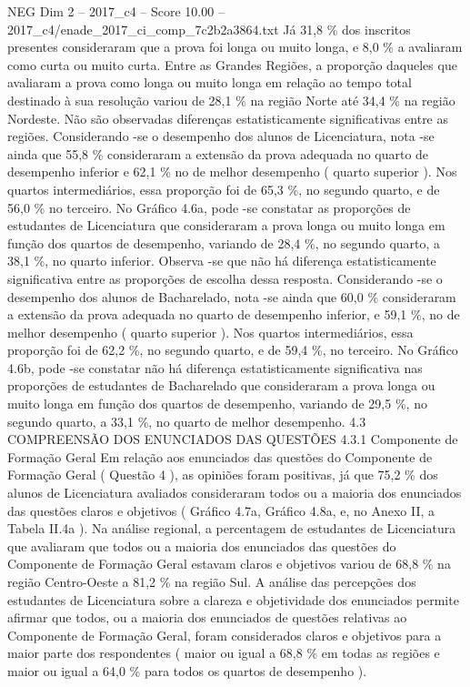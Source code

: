 \begin{textsample}{NEG Dim 2 – 2017\_c4 – Score 10.00 – 2017\_c4/enade\_2017\_ci\_comp\_7c2b2a3864.txt}
Já 31,8 \% dos inscritos presentes consideraram que a prova foi longa ou muito longa, e 8,0 \% a avaliaram como curta ou muito curta.
Entre as Grandes Regiões, a proporção daqueles que avaliaram a prova como longa ou muito longa em relação ao tempo total destinado à sua resolução variou de 28,1 \% na região Norte até 34,4 \% na região Nordeste.
Não são observadas diferenças estatisticamente significativas entre as regiões.
Considerando -se o desempenho dos alunos de Licenciatura, nota -se ainda que 55,8 \% consideraram a extensão da prova adequada no quarto de desempenho inferior e 62,1 \% no de melhor desempenho ( quarto superior ).
Nos quartos intermediários, essa proporção foi de 65,3 \%, no segundo quarto, e de 56,0 \% no terceiro.
No Gráfico 4.6a, pode -se constatar as proporções de estudantes de Licenciatura que consideraram a prova longa ou muito longa em função dos quartos de desempenho, variando de 28,4 \%, no segundo quarto, a 38,1 \%, no quarto inferior.
Observa -se que não há diferença estatisticamente significativa entre as proporções de escolha dessa resposta.
Considerando -se o desempenho dos alunos de Bacharelado, nota -se ainda que 60,0 \% consideraram a extensão da prova adequada no quarto de desempenho inferior, e 59,1 \%, no de melhor desempenho ( quarto superior ).
Nos quartos intermediários, essa proporção foi de 62,2 \%, no segundo quarto, e de 59,4 \%, no terceiro.
No Gráfico 4.6b, pode -se constatar não há diferença estatisticamente significativa nas proporções de estudantes de Bacharelado que consideraram a prova longa ou muito longa em função dos quartos de desempenho, variando de 29,5 \%, no segundo quarto, a 33,1 \%, no quarto de melhor desempenho. 4.3 COMPREENSÃO DOS ENUNCIADOS DAS QUESTÕES 4.3.1 Componente de Formação Geral Em relação aos enunciados das questões do Componente de Formação Geral ( Questão 4 ), as opiniões foram positivas, já que 75,2 \% dos alunos de Licenciatura avaliados consideraram todos ou a maioria dos enunciados das questões claros e objetivos ( Gráfico 4.7a, Gráfico 4.8a, e, no Anexo II, a Tabela II.4a ).
Na análise regional, a percentagem de estudantes de Licenciatura que avaliaram que todos ou a maioria dos enunciados das questões do Componente de Formação Geral estavam claros e objetivos variou de 68,8 \% na região Centro-Oeste a 81,2 \% na região Sul.
A análise das percepções dos estudantes de Licenciatura sobre a clareza e objetividade dos enunciados permite afirmar que todos, ou a maioria dos enunciados de questões relativas ao Componente de Formação Geral, foram considerados claros e objetivos para a maior parte dos respondentes ( maior ou igual a 68,8 \% em todas as regiões e maior ou igual a 64,0 \% para todos os quartos de desempenho ).

\end{textsample}
